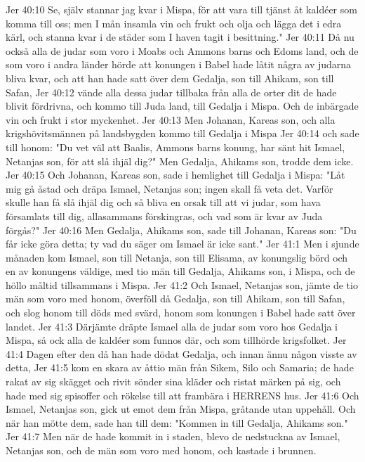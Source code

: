 Jer 40:10  Se, själv stannar jag kvar i Mispa, för att vara till tjänst åt kaldéer som komma till oss; men I mån insamla vin och frukt och olja och lägga det i edra kärl, och stanna kvar i de städer som I haven tagit i besittning."
Jer 40:11  Då nu också alla de judar som voro i Moabs och Ammons barns och Edoms land, och de som voro i andra länder hörde att konungen i Babel hade låtit några av judarna bliva kvar, och att han hade satt över dem Gedalja, son till Ahikam, son till Safan,
Jer 40:12  vände alla dessa judar tillbaka från alla de orter dit de hade blivit fördrivna, och kommo till Juda land, till Gedalja i Mispa. Och de inbärgade vin och frukt i stor myckenhet.
Jer 40:13  Men Johanan, Kareas son, och alla krigshövitsmännen på landsbygden kommo till Gedalja i Mispa
Jer 40:14  och sade till honom: "Du vet väl att Baalis, Ammons barns konung, har sänt hit Ismael, Netanjas son, för att slå ihjäl dig?" Men Gedalja, Ahikams son, trodde dem icke.
Jer 40:15  Och Johanan, Kareas son, sade i hemlighet till Gedalja i Mispa: "Låt mig gå åstad och dräpa Ismael, Netanjas son; ingen skall få veta det. Varför skulle han få slå ihjäl dig och så bliva en orsak till att vi judar, som hava församlats till dig, allasammans förskingras, och vad som är kvar av Juda förgås?"
Jer 40:16  Men Gedalja, Ahikams son, sade till Johanan, Kareas son: "Du får icke göra detta; ty vad du säger om Ismael är icke sant."
Jer 41:1  Men i sjunde månaden kom Ismael, son till Netanja, son till Elisama, av konungslig börd och en av konungens väldige, med tio män till Gedalja, Ahikams son, i Mispa, och de höllo måltid tillsammans i Mispa.
Jer 41:2  Och Ismael, Netanjas son, jämte de tio män som voro med honom, överföll då Gedalja, son till Ahikam, son till Safan, och slog honom till döds med svärd, honom som konungen i Babel hade satt över landet.
Jer 41:3  Därjämte dräpte Ismael alla de judar som voro hos Gedalja i Mispa, så ock alla de kaldéer som funnos där, och som tillhörde krigsfolket.
Jer 41:4  Dagen efter den då han hade dödat Gedalja, och innan ännu någon visste av detta,
Jer 41:5  kom en skara av åttio män från Sikem, Silo och Samaria; de hade rakat av sig skägget och rivit sönder sina kläder och ristat märken på sig, och hade med sig spisoffer och rökelse till att frambära i HERRENS hus.
Jer 41:6  Och Ismael, Netanjas son, gick ut emot dem från Mispa, gråtande utan uppehåll. Och när han mötte dem, sade han till dem: "Kommen in till Gedalja, Ahikams son."
Jer 41:7  Men när de hade kommit in i staden, blevo de nedstuckna av Ismael, Netanjas son, och de män som voro med honom, och kastade i brunnen.
